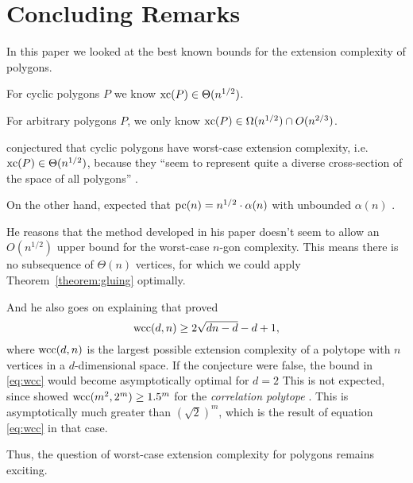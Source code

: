 \section{Concluding Remarks}

In this paper we looked at the best known bounds for the extension complexity of polygons.

For cyclic polygons $P$ we know $\operatorname{xc}(P) \in \Theta(n^{1/2})$.

For arbitrary polygons $P$, we only know $\operatorname{xc}(P) \in \Omega(n^{1/2}) \cap O(n^{2/3})$.

\citeauthor{kwan2020extension} conjectured that cyclic polygons have worst-case extension complexity, i.e.\ $\operatorname{xc}(P) \in \Theta(n^{1/2})$, because they ``seem to represent quite a diverse cross-section of the space of all polygons'' \cite[3]{kwan2020extension}.

On the other hand, \citeauthor{shitov2020sublinear} expected that $\operatorname{pc}(n) = n^{1/2} \cdot \alpha(n)$ with unbounded $\alpha(n)$ \cite[Conjecture 61]{shitov2020sublinear}.

He reasons that the method developed in his paper doesn't seem to allow an $O(n^{1/2})$ upper bound for the worst-case $n$-gon complexity. This means there is no subsequence of $\Theta(n)$ vertices, for which we could apply Theorem~\ref{theorem:gluing} optimally.

And he also goes on explaining that \textcite{padrol2016extension} proved
\begin{equation}\label{eq:wcc}
  \operatorname{wcc}(d,n) \geq 2\sqrt{dn-d}-d+1 ,
\end{equation}
where $\operatorname{wcc}(d,n)$ is the largest possible extension complexity of a polytope with $n$ vertices in a $d$-dimensional space.
If the conjecture were false, the bound in \eqref{eq:wcc} would become asymptotically optimal for $d=2$
This is not expected, since \citeauthor{kaibel2015short} showed $\operatorname{wcc}(m^2,2^m) \geq 1.5^m$ for the \emph{correlation polytope} \cite{kaibel2015short}. This is asymptotically much greater than $(\sqrt{2})^m$, which is the result of equation \eqref{eq:wcc} in that case.

Thus, the question of worst-case extension complexity for polygons remains exciting.
